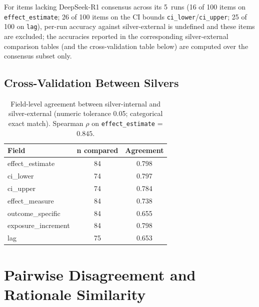 \documentclass[11pt]{article}
\newenvironment{fittab}{\begin{lrbox}{\fittabbox}}{\end{lrbox}%
  \ifdim\wd\fittabbox>\linewidth\resizebox{\linewidth}{!}{\usebox{\fittabbox}}\else\usebox{\fittabbox}\fi}
\begin{document}
For items lacking DeepSeek-R1 consensus across its 5~runs (16 of 100 items on \texttt{effect\_estimate}; 26 of 100 items on the CI bounds \texttt{ci\_lower}/\texttt{ci\_upper}; 25 of 100 on \texttt{lag}), per-run accuracy against silver-external is undefined and these items are excluded; the accuracies reported in the corresponding silver-external comparison tables (and the cross-validation table below) are computed over the consensus subset only.

\subsection{Cross-Validation Between Silvers}

\begin{table}[htbp]
\centering
\caption{Field-level agreement between silver-internal and silver-external (numeric tolerance 0.05; categorical exact match). Spearman $\rho$ on \texttt{effect\_estimate} = $\mathbf{0.845}$.}
\label{tab:silver_crossval}
\begin{fittab}\begin{tabular}{lcc}
\toprule
\textbf{Field} & \textbf{n compared} & \textbf{Agreement} \\
\midrule
effect\_estimate     & 84 & 0.798 \\
ci\_lower            & 74 & 0.797 \\
ci\_upper            & 74 & 0.784 \\
effect\_measure      & 84 & 0.738 \\
outcome\_specific    & 84 & 0.655 \\
exposure\_increment  & 84 & 0.798 \\
lag                  & 75 & 0.653 \\
\bottomrule
\end{tabular}\end{fittab}
\end{table}

\section{Pairwise Disagreement and Rationale Similarity}
\label{sec:pairwise_supp}
\end{document}
